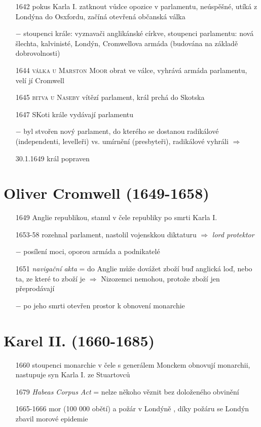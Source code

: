 \documentclass{article}
\begin{document}
\begin{itemize}
    \item[1642] pokus Karla I. zatknout vůdce opozice v parlamentu, neúspěšné, utíká z Londýna do Osxfordu, začíná otevřená občanská válka
    \item[$-$] stoupenci krále: vyznavači anglikánské církve, stoupenci parlamentu: nová šlechta, kalvinisté, Londýn, Cromwellova armáda (budována na základě dobrovolnosti)
    \item[1644] \textsc{válka u Marston Moor} obrat ve válce, vyhrává armáda parlamentu, velí jí Cromwell
    \item[1645] \textsc{bitva u Naseby} vítězí parlament, král prchá do Skotska
    \item[1647] SKoti krále vydávají parlamentu
    \item[$-$] byl stvořen nový parlament, do kterého se dostanou radikálové (independenti, levelleři) vs. umírnění (presbyteři), radikálové vyhráli $\Rightarrow$
    \item[30.1.1649] král popraven
\end{itemize}

\section*{Oliver Cromwell (1649-1658)}
\begin{itemize}
    \vspace{-0.5em}
    \setlength\itemsep{0.15em}
    \item[1649] Anglie republikou, stanul v čele republiky po smrti Karla I.
    \item[1653-58]  rozehnal parlament, nastolil vojenskkou diktaturu $\Rightarrow$ \textit{lord protektor}
    \item[$-$] posílení moci, oporou armáda a podnikatelé
    \item[1651] \textit{navigační akta} = do Anglie může dovážet zboží buď anglická loď, nebo ta, ze které to zboží je $\Rightarrow$ Nizozemci nemohou, protože zboží jen přeprodávají
    \item[$-$] po jeho smrti otevřen prostor k obnovení monarchie
\end{itemize}

\section*{Karel II. (1660-1685)}
\begin{itemize}
    \vspace{-0.5em}
    \setlength\itemsep{0.15em}
    \item[1660] stoupenci monarchie v čele s generálem Monckem obnovují monarchii, nastupuje syn Karla I. ze Stuartovců
    \item[1679] \textit{Habeas Corpus Act} = nelze někoho věznit bez doloženého obvinění
    \item[1665-1666] mor (100 000 obětí) a požár v Londýně , díky požáru se Londýn zbavil morové epidemie
\end{itemize}
\end{document}
